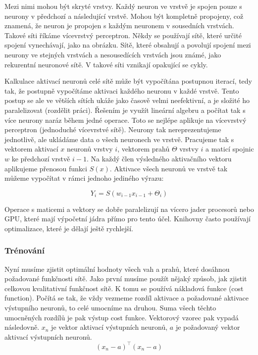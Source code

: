 \documentclass[a4paper,11pt, oneside]{book} \usepackage[czech]{babel}
\begin{document}
	Mezi nimi mohou být skryté vrstvy.
	Každý neuron ve vrstvě je spojen pouze s neurony v předchozí a následující vrstvě.
	Mohou být kompletně propojeny, což znamená, že neuron je propojen s každým neuronem v sousedních vrstvách.
	Takové síti říkáme vícevrstvý perceptron. Někdy se používají sítě, které určité spojení vynechávají, jako na obrázku.
	Sítě, které obsahují a povolují spojení mezi
	neurony ve stejných vrstvách a nesousedících vrstvách jsou známé, jako rekurentní neuronové
	sítě. V takové síti vznikají opakující se cykly.


	Kalkulace aktivací neuronů celé sítě může být vypočítána postupnou iterací, tedy
	tak, že postupně vypočítáme aktivaci každého neuronu v každé vrstvě. Tento postup se ale ve větších
	sítích ukáže jako časově velmi neefektivní, a je složité ho paralelizovat (rozdělit práci).
	Řešením je využít lineární algebru a počítat tak s více neurony naráz během jedné operace.
	Toto se nejlépe aplikuje na vícevrstvý perceptron (jednoduché vícevrstvé sítě).
	Neurony tak nereprezentujeme jednotlivě, ale ukládáme data o všech neuronech ve vrstvě.
	Pracujeme tak s vektorem aktivací \(x\) neuronů vrstvy \(i\), vektorem prahů \(\Theta\) vrstvy
	\(i\) a maticí spojnic \(w\) ke předchozí vrstvě \(i-1\). Na každý člen výsledného aktivačního
	vektoru aplikujeme přenosou funkci \(S(x)\).
	Aktivace všech neuronů ve vrstvě tak můžeme vypočítat v rámci jednoho jediného výrazu:

	\[Y_i = S(w_{i-1}  x_{i-1} + \Theta_i )\]

	Operace s maticemi a vektory se dobře paralelizují na vícero jader procesorů nebo GPU, které mají
	výpočetní jádra přímo pro tento účel. Knihovny často používají optimalizace, které je dělají ještě rychlejší.

	\subsubsection{Trénování}

	Nyní musíme zjistit optimální hodnoty všech vah a prahů, které dosáhnou požadované
	funkčnosti sítě. Jako první musíme použít nějaký způsob, jak zjistit celkovou
	kvalitativní funkčnost sítě. K tomu se používá nákladová funkce (cost function).
	Počítá se tak, že vždy vezmeme rozdíl aktivace a požadované aktivace výstupního neuronů,
	to celé umocníme na druhou. Suma všech těchto umocněných rozdílů je pak výstup cost funkce.
	Vektorový vzorec pak vypadá následovně. \(x_n\) je vektor aktivací výstupních neuronů,
	\(a\) je požadovaný vektor aktivací výstupních neuronů.
	\[ (x_n - a) ^ \top (x_n - a) \]
\end{document}

